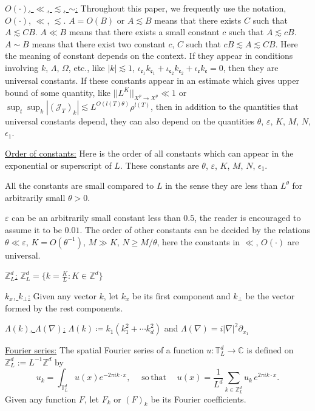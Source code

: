 \underline{$O(\cdot)$, $\ll$, $\lesssim$, $\sim$:} Throughout this paper, we frequently use the notation, $O(\cdot)$, $\ll$, $\lesssim$. $A=O(B)$ or $A\lesssim B$ means that there exists $C$ such that $A\lesssim CB$. $A\ll B$ means that there exists a small constant $c$ such that $A\lesssim cB$. $A\sim B$ means that there exist two constant $c$, $C$ such that $cB\lesssim A\lesssim CB$. Here the meaning of constant depends on the context. If they appear in conditions involving $k$, $\Lambda$, $\Omega$, etc., like $|k|\lesssim 1$, $\iota_{\mathfrak{e}_1}k_{\mathfrak{e}_1}+\iota_{\mathfrak{e}_2}k_{\mathfrak{e}_2}+\iota_{\mathfrak{e}}k_{\mathfrak{e}}=0$, then they are universal constants. If these constants appear in an estimate which gives upper bound of some quantity, like $||L^K||_{X^p\rightarrow X^p}\ll 1$ or $\sup_t\sup_k  |(\mathcal{J}_T)_k|\lesssim L^{O(l(T)\theta)} \rho^{l(T)}$, then in addition to the quantities that universal constants depend, they can also depend on the quantities $\theta$, $\varepsilon$, $K$, $M$, $N$, $\epsilon_1$.

\underline{Order of constants:} Here is the order of all constants which can appear in the exponential or superscript of $L$. These constants are $\theta$, $\varepsilon$, $K$, $M$, $N$, $\epsilon_1$.%

All the constants are small compared to $L$ in the sense they are less than $L^{\theta}$ for arbitrarily small $\theta>0$.

$\varepsilon$ can be an arbitrarily small constant less than $0.5$, the reader is encouraged to assume it to be $0.01$. The order of other constants can be decided by the relations $\theta\ll \varepsilon$, $K=O(\theta^{-1})$, $M\gg K$, $N\ge M/\theta$, here the constants in $\ll$, $O(\cdot)$ are universal. 

\underline{$\mathbb{Z}_L^d$:} $\mathbb{Z}_L^d= \{k=\frac{K}{L}:K\in \mathbb{Z}^d\}$

\underline{$k_x$, $k_{\perp}$:} Given any vector $k$, let $k_x$ be its first component and $k_{\perp}$ be the vector formed by the rest components. 

\underline{$\Lambda(k)$, $\Lambda(\nabla)$:} $\Lambda(k)\coloneqq k_{1}(k_1^2+\cdots k_d^2)$ and $\Lambda(\nabla) = i|\nabla|^2\partial_{x_1}$

\underline{Fourier series:} The spatial Fourier series of a function $u: \mathbb{T}_L^d \to \mathbb C$ is defined on $\mathbb{Z}^d_L:=L^{-1}\mathbb{Z}^{d}$ by
\begin{equation}\label{fourierset}
u_k=\int_{\mathbb{T}^d_L} u(x) e^{-2\pi i k\cdot x},\quad \mathrm{\; so \,that \;}\quad u(x)=\frac{1}{L^d}\sum_{k \in \mathbb{Z}^d_L} u_k \,e^{2\pi i k\cdot x}. 
\end{equation}
Given any function $F$, let $F_k$ or $(F)_k$ be its Fourier coefficients.

